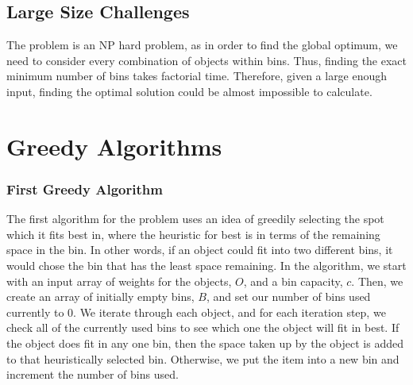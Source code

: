 \documentclass[11pt]{article}
\begin{document}
\begin{multicols}{2}
	\subsection{Large Size Challenges}
	The problem is an NP hard problem, as in order to find the global optimum, we need to consider
	every combination of objects within bins. Thus, finding the exact minimum number of bins takes
	factorial time. Therefore, given a large enough input, finding the optimal solution could be almost
	impossible to calculate.

	\section{Greedy Algorithms}
	\subsubsection{First Greedy Algorithm}
	The first algorithm for the problem uses an idea of greedily selecting the spot which it fits best
	in, where the heuristic for best is in terms of the remaining space in the bin. In other words, if an
	object could fit into two different bins, it would chose the bin that has the least space remaining.
	In the algorithm, we start with an input array of weights for the objects, ${O}$, and a bin
	capacity, ${c}$. Then, we create an array of initially empty bins, ${B}$, and set our number of bins
	used currently to 0. We iterate through each object, and for each iteration step, we check all of
	the currently used bins to see which one the object will fit in best. If the object does fit in any
	one bin, then
	the space taken up by the object is added to that heuristically selected bin. Otherwise, we put the
	item into a new bin and increment the number of bins used.


\end{multicols}
\end{document}
